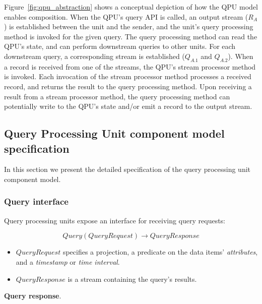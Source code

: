 Figure~\ref{fig:qpu_abstraction} shows a conceptual depiction of how the QPU model enables composition.
When the QPU's query API is called, an output stream ($R_A$) is established between the unit and the sender,
and the unit's query processing method is invoked for the given query.
The query processing method can read the QPU's state, and can perform downstream queries to other units.
For each downstream query, a corresponding stream is established ($Q_{A.1}$ and $Q_{A.2}$).
When a record is received from one of the streams, the QPU's stream processor method is invoked.
Each invocation of the stream processor method processes a received record, and returns the result to the query processing
method.
Upon receiving a result from a stream processor method,
the query processing method can potentially write to the QPU's state and/or emit a record to the output stream.


\subsection{Query Processing Unit component model specification}
\label{ref:specification}

In this section we present the detailed specification of the query processing unit component model.

\subsubsection{Query interface}
\label{ref:query_interface}

Query processing units expose an interface for receiving query requests:

\begin{displaymath}
  Query(QueryRequest) \rightarrow QueryResponse
\end{displaymath}

\begin{itemize}
  \item $QueryRequest$ specifies a projection, a predicate on the data items' \textit{attributes},
  and a \textit{timestamp} or \textit{time interval}.

  \item $QueryResponse$ is a stream containing the query's results.
\end{itemize}

\bigskip
\noindent
\textbf{Query response}.

